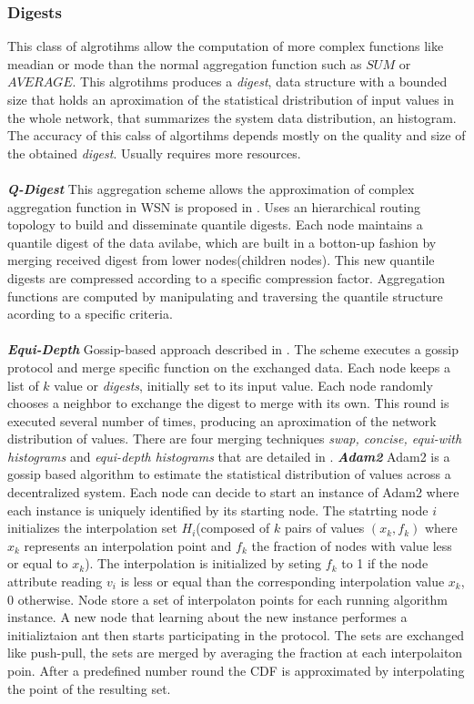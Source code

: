 \subsubsection{Digests}
This class of algrotihms allow the computation of more complex functions like meadian or mode than the normal aggregation function such as $SUM$ or $AVERAGE$. This algrotihms produces a \textit{digest}, data structure with a bounded size that holds an aproximation of the statistical dristribution of input values in the whole network, that summarizes the system data distribution, an histogram. The accuracy of this calss of algortihms depends mostly on the quality and size of the obtained \textit{digest}. Usually requires more resources.\\
\\
\textbf{\textit{Q-Digest}} This aggregation scheme allows the approximation of complex aggregation function in WSN is proposed in \cite{shrivastava2004medians}. Uses an hierarchical routing topology to build and disseminate quantile digests. Each node maintains a quantile digest of the data avilabe, which are built in a botton-up fashion by merging received digest from lower nodes(children nodes). This new quantile digests are compressed according to a specific compression factor. Aggregation functions are computed by manipulating and traversing the quantile structure acording to a specific criteria.\\
\\
\textbf{\textit{Equi-Depth}} Gossip-based approach described in  \cite{horowitz2003estimating}. The scheme executes a  gossip protocol and merge specific function on the exchanged data. Each node keeps a list of $k$ value or \textit{digests}, initially set to its input value. Each node randomly chooses a neighbor to exchange the digest to merge with its own. This round is executed several number of times, producing an aproximation of the network distribution of values. There are four merging techniques \textit{swap, concise, equi-with histograms} and \textit{equi-depth histograms} that are detailed in \cite{journals/corr/abs-1110-0725}.
\textbf{\textit{Adam2}}
Adam2 is a gossip based algorithm to estimate the statistical distribution of values across a decentralized system\cite{sacha2010adam2}. Each node can decide to start an instance of Adam2 where each instance is uniquely identified by its starting node. The statrting node $i$ initializes the interpolation set $H_i$(composed of $k$ pairs of values $(x_k,f_k)$ where $x_k$ represents an interpolation point and $f_k$ the fraction of nodes with value less or equal to $x_k$). The interpolation is initialized by seting $f_k$ to 1 if the node attribute reading $v_i$ is less or equal than the corresponding interpolation value $x_k$, 0 otherwise. Node store a set of interpolaton points for each running algorithm instance.  A new node that learning about the new instance performes a initializtaion ant then starts participating in the protocol. The sets are exchanged like push-pull, the sets are merged by averaging the fraction at each interpolaiton poin. After a predefined number round the CDF is approximated by interpolating the point of the resulting set.



